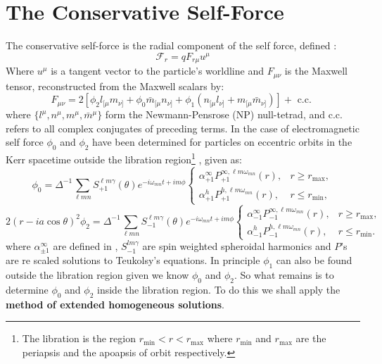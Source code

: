 \documentclass[preprint,showpacs,preprintnumbers,amssymb,superscriptaddress,aps,prd,nofootinbib,11pt]{revtex4-1}
\newcommand{\beq}{\begin{equation}}
\newcommand{\eeq}{\end{equation}}
\newcommand{\rmin}{r_{\text{min}}}
\newcommand{\rmax}{r_{\text{max}}}
\begin{document}
\section{The Conservative Self-Force}
The conservative self-force is the radial component of the self force, defined \cite{TorresDolan2022}:
\begin{equation}
    \mathcal{F}_r = q F_{r\mu} u^\mu
\end{equation}
Where $u^\mu$ is a tangent vector to the particle's worldline and $F_{\mu\nu}$ is the Maxwell tensor, reconstructed from the Maxwell scalars by:
\begin{equation}
    F_{\mu \nu}=2\left[\phi_2 l_{[\mu} m_{\nu]}+\phi_0 \bar{m}_{[\mu} n_{\nu]}+\phi_1\left(n_{[\mu} l_{\nu]}+m_{[\mu} \bar{m}_{\nu]}\right)\right]+\text { c.c. }
\end{equation}
where $\{l^\mu,n^\mu, m^\mu, \bar{m}^\mu\}$ form the Newmann-Pensrose (NP) null-tetrad, and c.c. refers to all complex conjugates of preceding terms. In the case of electromagnetic self force $\phi_0$ and $\phi_2$ have been determined for particles on eccentric orbits in the Kerr spacetime outside the libration region\footnote{The libration is the region $r_\text{min} < r < r_\text{max}$ where $r_\text{min}$ and $r_\text{max}$ are the periapsis and the apoapsis of orbit respectively.} \cite{german2023adiabatic}, given as:
\beq
\phi_0 = \Delta^{-1} \sum_{\ell m n} S_{+1}^{\ell m \gamma}(\theta) e^{- i \omega_{mn} t + i m \phi}  
\begin{cases}
 \alpha_{+1}^{\infty} P_{+1}^{\infty , \ell m \omega_{mn}}(r) , & r \ge \rmax , \\
 \alpha_{+1}^{h} P_{+1}^{h , \ell m \omega_{mn}}(r) , & r \le \rmin , 
\end{cases}
\eeq
\beq
2 (r-i a \cos \theta)^2 \phi_2 = \Delta^{-1} \sum_{\ell m n} S_{-1}^{\ell m \gamma}(\theta) e^{- i \omega_{mn} t + i m \phi}  
\begin{cases}
 \alpha_{-1}^{\infty} P_{-1}^{\infty , \ell m \omega_{mn}}(r) , & r \ge \rmax , \\
 \alpha_{-1}^{h} P_{-1}^{h , \ell m \omega_{mn}}(r) , & r \le \rmin . 
\end{cases}
\eeq
where $\alpha^{\infty}_{\pm1}$ are defined in \cite{german2023adiabatic}, $S^{lm\gamma}_{-1}$ are spin weighted spheroidal harmonics and $P$'s are re scaled solutions to Teukolsy's equations.  In principle $\phi_1$ can also be found outside the libration region given we know $\phi_0$ and $\phi_2$. So what remains is to determine $\phi_0$ and $\phi_2$ inside the libration region. To do this we shall apply the \textbf{method of extended homogeneous solutions}.
\end{document}

